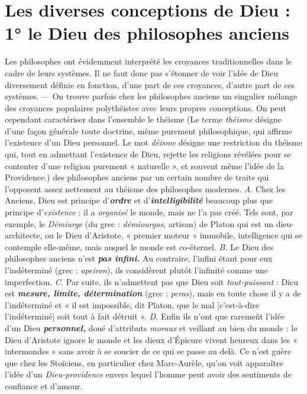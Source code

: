 \section{Les diverses conceptions de Dieu : 1° le Dieu des philosophes
anciens}%
Les philosophes ont évidemment interprété les
croyances traditionnelles dans le cadre de leurs systèmes. Il ne faut
donc pas s’étonner de voir l’idée de Dieu diversement définie en
fonction, d’une part de ces croyances, d'autre part de ces systèmes. —
On trouve parfois chez les philosophes anciens un singulier mélange
des croyances populaires polythéistes avec leurs propres conceptions.
On peut cependant caractériser dans l’ensemble le théisme
{\footnotesize (Le terme {\it théisme} désigne d'une façon générale toute doctrine, même purement
philosophique, qui affirme l'existence d'un Dieu personnel. Le mot {\it déisme} désigne une
restriction du théisme qui, tout en admettant l'existence de Dieu, rejette les religions
révélées pour se contenter d’une religion purement « naturelle », et souvent même l'idée
de la Providence.)}
des philosophes
anciens par un certain nombre de traits qui l’opposent assez
nettement au théisme des philosophes modernes. {\it A}. Chez les Anciens,
Dieu est principe d’\textbf{\textit {ordre}} et d’\textbf{\textit {intelligibilité}} beaucoup plus que
principe d'{\it existence} : il a {\it organisé} le monde, mais {\it }ne l’a pas créé. Tels
sont, par exemple, le {\it Démiurge} (du grec : {\it démiourgos}, artisan) de
Platon qui est un dieu-architecte, ou le Dieu d’Aristote, « premier
moteur » immobile, intelligence qui se contemple elle-même, mais
auquel le monde est co-éternel. {\it B.} Le Dieu des philosophes anciens
n’est \textbf{\textit {pas infini.}} Au contraire, l'infini étant pour eux l’indéterminé
(grec : {\it apeiron}), ils considèrent plutôt l’infinité comme une imperfection.
{\it C.} Par suite, ils n’admettent pas que Dieu soit {\it tout-puissant} :
Dicu est \textbf{\textit {mesure, limite, détermination}} (grec : {\it peras}), mais en toute
chose il y a de l’indéterminé et « il est impossible, dit Platon, que le
mal [c’est-à-dire l’indéterminé] soit tout à fait détruit ». {\it D.} Enfin
ils n’ont que raremeñt l’idée d’un Dieu \textbf{\textit {personnel,}} doué d’attributs
{\it moraux} et veillant au bien du monde : le Dieu d’Aristote ignore le
monde et les dieux d’Épicure vivent heureux dans les « intermondes »
sans avoir à se soucier de ce qui se passe au delà. Ce n’est guère que
chez les Stoïciens, en particulier chez Marc-Aurèle, qu’on voit apparaître
l’idée d’un {\it Dieu-providence} envers lequel l’homme peut avoir
des sentiments de confiance et d’amour.

